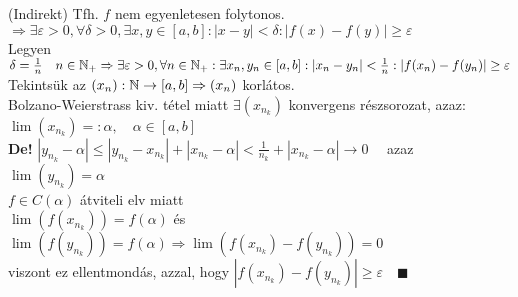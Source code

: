 \documentclass[a4paper,11pt]{article}
\begin{document}
\biz (Indirekt) Tfh. $f$ nem egyenletesen folytonos.\\[0.1cm]$\Rightarrow\exists\varepsilon > 0, \forall\delta > 0, \exists x,y\in[a,b]: |x-y| < \delta : |f(x) - f(y)| \geq\varepsilon$\\[0.1cm] Legyen $\delta = \frac{1}{n}\quad n\in\mathbb{N}_+ \Rightarrow \exists\varepsilon > 0, \forall n\in\mathbb{N}_+: \exists x_n,y_n\in[a,b]: |x_n-y_n| < \frac{1}{n}: |f(x_n)-f(y_n)|\geq\varepsilon$ \\[0.1cm] Tekintsük az $(x_n): \mathbb{N}\to[a,b]\Rightarrow (x_n)$ korlátos.\\[0.1cm] Bolzano-Weierstrass kiv. tétel miatt $\exists(x_{n_k})$ konvergens részsorozat, azaz:\\[0.1cm] $\lim(x_{n_k}) =: \alpha,\quad\alpha\in[a,b]$\\[0.1cm] \textbf{De!} $|y_{n_k}-\alpha|\leq|y_{n_k}-x_{n_k}|+|x_{n_k}-\alpha| < \frac{1}{n_k}+|x_{n_k}-\alpha|\to0\quad$ azaz $\lim(y_{n_k}) = \alpha$\\[0.1cm] $f\in C(\alpha)$ átviteli elv miatt\\[0.1cm]$\lim(f(x_{n_k})) = f(\alpha)$ és $\lim(f(y_{n_k})) = f(\alpha)\Rightarrow\lim(f(x_{n_k})-f(y_{n_k})) = 0$\\[0.1cm] viszont ez ellentmondás, azzal, hogy $|f(x_{n_k})-f(y_{n_k})|\geq\varepsilon\quad\blacksquare$
\end{document}
